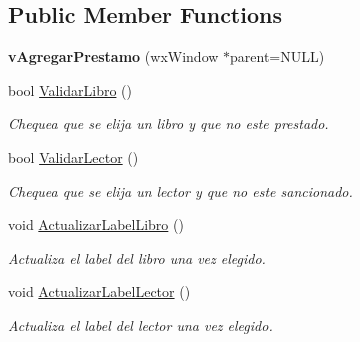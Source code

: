 \subsection*{Public Member Functions}
\begin{DoxyCompactItemize}
\item 
{\bfseries v\+Agregar\+Prestamo} (wx\+Window $\ast$parent=N\+U\+LL)\hypertarget{classv_agregar_prestamo_a515c133ac2af77bce4108930e6dfce5f}{}\label{classv_agregar_prestamo_a515c133ac2af77bce4108930e6dfce5f}

\item 
bool \hyperlink{classv_agregar_prestamo_afc5121b40bfaa0349e9d830aba3f4ff9}{Validar\+Libro} ()\hypertarget{classv_agregar_prestamo_afc5121b40bfaa0349e9d830aba3f4ff9}{}\label{classv_agregar_prestamo_afc5121b40bfaa0349e9d830aba3f4ff9}

\begin{DoxyCompactList}\small\item\em Chequea que se elija un libro y que no este prestado. \end{DoxyCompactList}\item 
bool \hyperlink{classv_agregar_prestamo_ab813531853a031f015f9765d88776cc0}{Validar\+Lector} ()\hypertarget{classv_agregar_prestamo_ab813531853a031f015f9765d88776cc0}{}\label{classv_agregar_prestamo_ab813531853a031f015f9765d88776cc0}

\begin{DoxyCompactList}\small\item\em Chequea que se elija un lector y que no este sancionado. \end{DoxyCompactList}\item 
void \hyperlink{classv_agregar_prestamo_a2eada8be7864922c56543edfcc01741e}{Actualizar\+Label\+Libro} ()\hypertarget{classv_agregar_prestamo_a2eada8be7864922c56543edfcc01741e}{}\label{classv_agregar_prestamo_a2eada8be7864922c56543edfcc01741e}

\begin{DoxyCompactList}\small\item\em Actualiza el label del libro una vez elegido. \end{DoxyCompactList}\item 
void \hyperlink{classv_agregar_prestamo_a96536c490efb539cf025a349c30e570c}{Actualizar\+Label\+Lector} ()\hypertarget{classv_agregar_prestamo_a96536c490efb539cf025a349c30e570c}{}\label{classv_agregar_prestamo_a96536c490efb539cf025a349c30e570c}

\begin{DoxyCompactList}\small\item\em Actualiza el label del lector una vez elegido. \end{DoxyCompactList}\end{DoxyCompactItemize}
